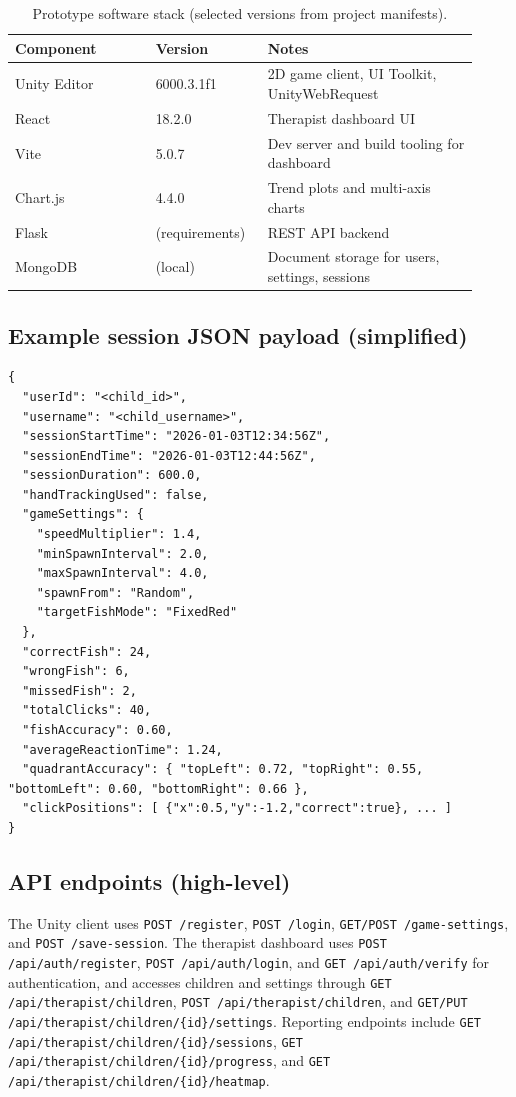 \documentclass[12pt]{article}
\begin{document}
\begin{table}[H]
\centering
\caption{Prototype software stack (selected versions from project manifests).}
\label{tab:stack_versions}
\begin{tabular}{p{0.28\linewidth} p{0.22\linewidth} p{0.42\linewidth}}
\toprule
\textbf{Component} & \textbf{Version} & \textbf{Notes} \\
\midrule
Unity Editor & 6000.3.1f1 & 2D game client, UI Toolkit, UnityWebRequest \\
React & 18.2.0 & Therapist dashboard UI \\
Vite & 5.0.7 & Dev server and build tooling for dashboard \\
Chart.js & 4.4.0 & Trend plots and multi-axis charts \\
Flask & (requirements) & REST API backend \\
MongoDB & (local) & Document storage for users, settings, sessions \\
\bottomrule
\end{tabular}
\end{table}

\subsection*{Example session JSON payload (simplified)}
\begin{verbatim}
{
  "userId": "<child_id>",
  "username": "<child_username>",
  "sessionStartTime": "2026-01-03T12:34:56Z",
  "sessionEndTime": "2026-01-03T12:44:56Z",
  "sessionDuration": 600.0,
  "handTrackingUsed": false,
  "gameSettings": {
    "speedMultiplier": 1.4,
    "minSpawnInterval": 2.0,
    "maxSpawnInterval": 4.0,
    "spawnFrom": "Random",
    "targetFishMode": "FixedRed"
  },
  "correctFish": 24,
  "wrongFish": 6,
  "missedFish": 2,
  "totalClicks": 40,
  "fishAccuracy": 0.60,
  "averageReactionTime": 1.24,
  "quadrantAccuracy": { "topLeft": 0.72, "topRight": 0.55, "bottomLeft": 0.60, "bottomRight": 0.66 },
  "clickPositions": [ {"x":0.5,"y":-1.2,"correct":true}, ... ]
}
\end{verbatim}

\subsection*{API endpoints (high-level)}
The Unity client uses \texttt{POST /register}, \texttt{POST /login}, \texttt{GET/POST /game-settings}, and \texttt{POST /save-session}. The therapist dashboard uses \texttt{POST /api/auth/register}, \texttt{POST /api/auth/login}, and \texttt{GET /api/auth/verify} for authentication, and accesses children and settings through \texttt{GET /api/therapist/children}, \texttt{POST /api/therapist/children}, and \texttt{GET/PUT /api/therapist/children/\{id\}/settings}. Reporting endpoints include \texttt{GET /api/therapist/children/\{id\}/sessions}, \texttt{GET /api/therapist/children/\{id\}/progress}, and \texttt{GET /api/therapist/children/\{id\}/heatmap}.
\end{document}
